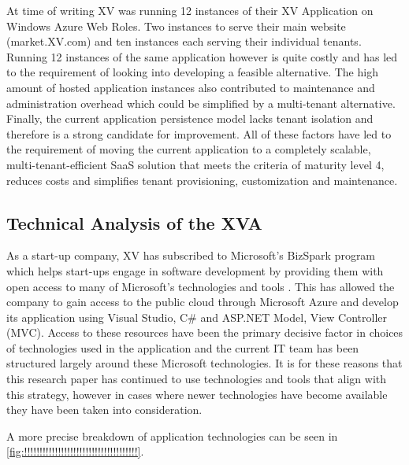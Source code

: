 
 
At time of writing XV was running 12 instances of their XV Application on Windows Azure Web Roles. Two instances to serve their main website (market.XV.com) and ten instances each serving their individual tenants. Running 12 instances of the same application however is quite costly and has led to the requirement of looking into developing a feasible alternative. The high amount of hosted application instances also contributed to maintenance and administration overhead which could be simplified by a multi-tenant alternative. Finally, the current application persistence model lacks tenant isolation and therefore is a strong candidate for improvement. All of these factors have led to the requirement of moving the current application to a completely scalable, multi-tenant-efficient SaaS solution that meets the criteria of maturity level 4, reduces costs and simplifies tenant provisioning, customization and maintenance.




\subsection{Technical Analysis of the XVA}

As a start-up company, XV has subscribed to Microsoft's BizSpark program which helps start-ups engage in software development by providing them with open access to many of Microsoft's technologies and tools \cite{BizSpark}. This has allowed the company to gain access to the public cloud through Microsoft Azure and develop its application using Visual Studio, C\# and ASP.NET Model, View Controller (MVC). Access to these resources have been the primary decisive factor in choices of technologies used in the application and the current IT team has been structured largely around these Microsoft technologies. It is for these reasons that this research paper has continued to use technologies and tools that align with this strategy, however in cases where newer technologies have become available they have been taken into consideration.
 
 
A more precise breakdown of application technologies can be seen in \ref{fig:!!!!!!!!!!!!!!!!!!!!!!!!!!!!!!!!!!!!!}.


